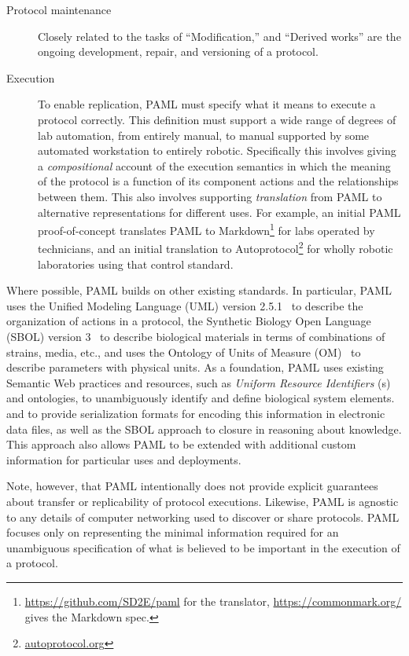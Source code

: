 \begin{description}
\item[Protocol maintenance] Closely related to the tasks of ``Modification,'' and ``Derived works'' are the ongoing development, repair, and versioning of a protocol.

\item[Execution] To enable replication, PAML must specify what it means to execute a protocol correctly.  This definition must support a wide range of degrees of lab automation, from entirely manual, to manual supported by some automated workstation to entirely robotic.  Specifically this involves giving a \emph{compositional} account of the execution semantics in which the meaning of the protocol is a function of its component actions and the relationships between them.  This also involves supporting \emph{translation} from PAML to alternative representations for different uses.  For example, an initial PAML proof-of-concept translates PAML to Markdown\footnote{\url{https://github.com/SD2E/paml} for the translator, \url{https://commonmark.org/} gives the Markdown spec.} for labs operated by technicians, and an initial translation to Autoprotocol\footnote{\url{autoprotocol.org}} for wholly robotic laboratories using that control standard.

\end{description}

Where possible, PAML builds on other existing standards.
In particular, PAML uses the Unified Modeling Language (UML) version 2.5.1~\citep{uml251} to describe the organization of actions in a protocol, the Synthetic Biology Open Language (SBOL) version 3~\citep{SBOL3} to describe biological materials in terms of combinations of strains, media, etc., and uses the Ontology of Units of Measure (OM)~\citep{om2} to describe parameters with physical units.
As a foundation, PAML uses existing Semantic Web practices and resources, such as \emph{Uniform Resource Identifiers} (s) and ontologies, to unambiguously identify and define biological system elements.
and to provide serialization formats for encoding this information in electronic data files, as well as the SBOL approach to closure in reasoning about knowledge.
This approach also allows PAML to be extended with additional custom information for particular uses and deployments.

Note, however, that PAML intentionally does not provide explicit guarantees about transfer or replicability of protocol executions. 
Likewise, PAML is agnostic to any details of computer networking used to discover or share protocols.
PAML focuses only on representing the minimal information required for an unambiguous specification of what is believed to be important in the execution of a protocol.


